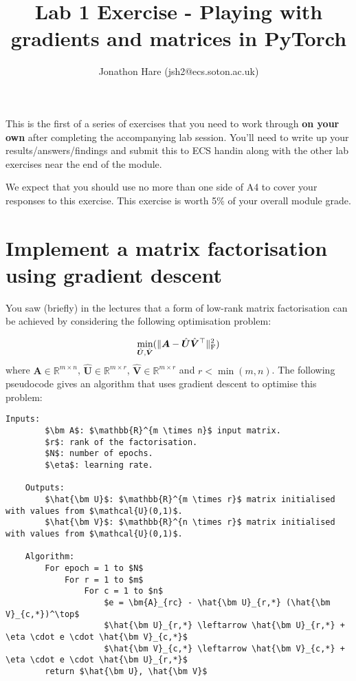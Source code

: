 \documentclass[a4paper]{article}
\begin{document}
\setlength{\leftskip}{20pt}
\title{Lab 1 Exercise - Playing with gradients and matrices in PyTorch}
\author{Jonathon Hare (jsh2@ecs.soton.ac.uk)}

\maketitle


This is the first of a series of exercises that you need to work through \textbf{on your own} after completing the accompanying lab session. You'll need to write up your results/answers/findings and submit this to ECS handin along with the other lab exercises near the end of the module. 

We expect that you should use no more than one side of A4 to cover your responses to this exercise. This exercise is worth 5\% of your overall module grade.

\section{Implement a matrix factorisation using gradient descent}\label{sgd}

You saw (briefly) in the lectures that a form of low-rank matrix factorisation can be achieved by considering the following optimisation problem:

\begin{equation}
	\min\limits_{\hat{\bm U}, \hat{\bm V}}( \| \bm A - \hat{\bm U}\hat{\bm V}^\top \|_{\rm F}^2 )
\end{equation}
where $\bm A \in \mathbb{R}^{m \times n}$, $\hat{\bm U} \in \mathbb{R}^{m \times r}$, $\hat{\bm V} \in \mathbb{R}^{m \times r}$ and $r<\min(m,n)$. The following pseudocode gives an algorithm that uses gradient descent to optimise this problem:

\begin{lstlisting}[mathescape=true,tabsize=4]
	Inputs: 
		$\bm A$: $\mathbb{R}^{m \times n}$ input matrix.
		$r$: rank of the factorisation.
		$N$: number of epochs.
		$\eta$: learning rate.

	Outputs:
		$\hat{\bm U}$: $\mathbb{R}^{m \times r}$ matrix initialised with values from $\mathcal{U}(0,1)$.
		$\hat{\bm V}$: $\mathbb{R}^{n \times r}$ matrix initialised with values from $\mathcal{U}(0,1)$.

	Algorithm:
		For epoch = 1 to $N$
			For r = 1 to $m$
				For c = 1 to $n$
					$e = \bm{A}_{rc} - \hat{\bm U}_{r,*} (\hat{\bm V}_{c,*})^\top$
					$\hat{\bm U}_{r,*} \leftarrow \hat{\bm U}_{r,*} + \eta \cdot e \cdot \hat{\bm V}_{c,*}$
					$\hat{\bm V}_{c,*} \leftarrow \hat{\bm V}_{c,*} + \eta \cdot e \cdot \hat{\bm U}_{r,*}$
		return $\hat{\bm U}, \hat{\bm V}$
\end{lstlisting}
\end{document}
